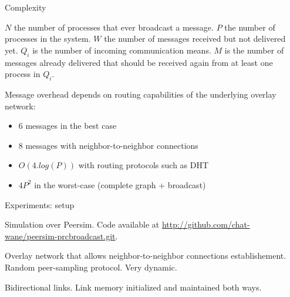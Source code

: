 \documentclass[10pt, xcolor={usenames, dvipsnames}]{beamer}
\begin{document}
\begin{frame}{Complexity}

  \begin{table}
    \begin{center}
      \caption{\scriptsize $N$ the number of processes that ever broadcast a
        message. $P$ the number of processes in the system. $W$ the number of
        messages received but not delivered yet. $Q_i$ is the number of incoming
        communication means. $M$ is the number of messages already delivered
        that should be received again from at least one process in $Q_i$.}
      
    \end{center}
  \end{table}

  \vspace{2em}
  
  Message overhead depends on routing capabilities of the underlying overlay
  network:
  \begin{itemize}
  \item 6 messages in the best case
  \item 8 messages with neighbor-to-neighbor connections
  \item $O(4.log(P))$ with routing protocols such as DHT
  \item $4P^2$ in the worst-case (complete graph + broadcast)
  \end{itemize}
  

\end{frame}

\begin{frame}{Experiments: setup}
  
  Simulation over Peersim. Code available at \url{http://github.com/chat-wane/peersim-prcbroadcast.git}.

  Overlay network that allows neighbor-to-neighbor connections
  establishement. Random peer-sampling protocol. Very dynamic.
  
  Bidirectional links. Link memory initialized and maintained both ways.
    
\end{frame}
\end{document}
